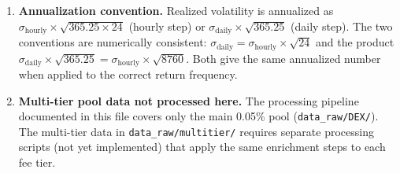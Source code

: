 \documentclass[11pt,a4paper]{article}
\begin{document}
\begin{enumerate}
  \item \textbf{Annualization convention.} Realized volatility is
        annualized as $\sigma_{\mathrm{hourly}} \times \sqrt{365.25 \times
        24}$ (hourly step) or $\sigma_{\mathrm{daily}} \times
        \sqrt{365.25}$ (daily step). The two conventions are numerically
        consistent: $\sigma_{\mathrm{daily}} = \sigma_{\mathrm{hourly}}
        \times \sqrt{24}$ and the product $\sigma_{\mathrm{daily}} \times
        \sqrt{365.25} = \sigma_{\mathrm{hourly}} \times \sqrt{8760}$.
        Both give the same annualized number when applied to the correct
        return frequency.

  \item \textbf{Multi-tier pool data not processed here.} The processing
        pipeline documented in this file covers only the main 0.05\% pool
        (\texttt{data\_raw/DEX/}). The multi-tier data in
        \texttt{data\_raw/multitier/} requires separate processing scripts
        (not yet implemented) that apply the same enrichment steps to
        each fee tier.
\end{enumerate}
\end{document}
